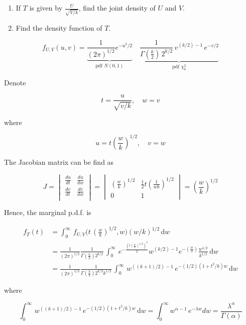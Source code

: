 \documentclass[
  letterpaper,
  DIV=11,
  numbers=noendperiod]{scrreprt}
\theoremstyle{plain}
\theoremstyle{remark}
\begin{document}
\begin{enumerate}
\def\labelenumi{\arabic{enumi}.}
\item
  If \(T\) is given by \(\frac{U}{\sqrt{V/k}}\), find the joint density
  of \(U\) and \(V\).
\item
  Find the density function of \(T\).
\end{enumerate}

\[
   f_{U,V}(u,v) = \underbrace{\frac{1}{(2\pi)^{1/2}} e^{-u^2/2}}_{\text{pdf } N(0,1)}\quad \underbrace{\frac{1}{\Gamma(\frac{k}{2})\,2^{k/2}}\,v^{(k/2)-1}\, e^{-v/2}}_{\text{pdf }\chi^2_k}
\]

Denote

\[
   t=\frac{u}{\sqrt{v/k}}, \quad w=v
\]

where

\[
   u=t(\frac{w}{k})^{1/2}, \quad v= w
\]

The Jacobian matrix can be find as

\[
   J=\begin{vmatrix}
   \frac{du}{dt} & \frac{du}{dw}\\
   \frac{dv}{dt} & \frac{dv}{dw}\\
   \end{vmatrix}=\begin{vmatrix}
   (\frac{w}{k})^{1/2} & \frac{1}{2}t(\frac{1}{wk})^{1/2}\\
   0&1
   \end{vmatrix}=(\frac{w}{k})^{1/2}
\]

Hence, the marginal p.d.f. is

\[
   \begin{aligned}
   f_T(t) &= \displaystyle\int_0^\infty \,f_{U,V}\bigg(t\,(\frac{w}{k})^{1/2},w\bigg)(w/k)^{1/2}\,\mathrm{d} w\\[2ex]
   &= \frac{1}{(2\pi)^{1/2}}\frac{1}{\Gamma(\frac{k}{2})2^{k/2}}\,
   \int_0^\infty\,
   e^{-\frac{\left(t(\frac{w}{k})^{1/2}\right)^2}{2}}
   w^{(k/2)-1}
   e^{-(\frac{w}{2})}
   \frac{w^{1/2}}{k^{1/2}}\,\mathrm{d}w\\[2ex]
   &= \frac{1}{(2\pi)^{1/2}}\frac{1}{\Gamma(\frac{k}{2})2^{k/2}k^{1/2}}\,
   \displaystyle\int_0^\infty\,
   w^{((k+1)/2)-1}\,e^{-(1/2)(1 + t^2/k)w}\,\mathrm{d}w
   \end{aligned}
\]

where

\[
   \int_0^\infty\,
   w^{((k+1)/2)-1}\,e^{-(1/2)(1 + t^2/k)w}\,\mathrm{d}w=\int_0^{\infty}w^{\alpha-1}\,e^{-\lambda w}dw=\frac{\lambda^\alpha}{\Gamma(\alpha)}
\]
\end{document}
